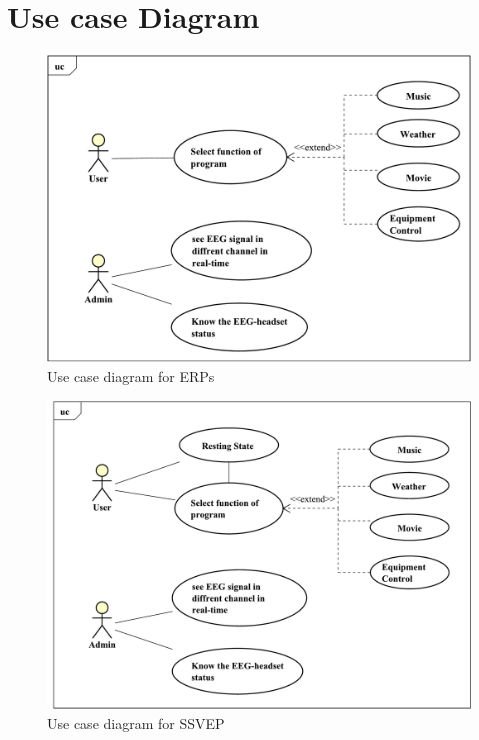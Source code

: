 \newpage
\section{Use case Diagram}

\begin{figure}[ht]
	\centering \includegraphics[scale=0.3836]{chapter4/uc_ERP.pdf}
	\caption{Use case diagram for ERPs}
\end{figure}

\begin{figure}[ht]
	\centering \includegraphics[scale=0.3736]{chapter4/uc_ssvep.pdf}
	\caption{Use case diagram for SSVEP}
\end{figure}

\newpage

